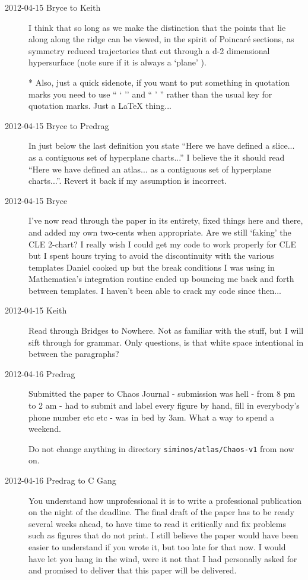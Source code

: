 \begin{description}
\item[2012-04-15 Bryce to Keith] I think that so long as we make the distinction that the points that lie along along the ridge can be viewed, in the spirit of Poincar\'{e} sections, as symmetry reduced trajectories that cut through a d-2 dimensional hypersurface (note sure if it is always a `plane' ).

* Also, just a quick sidenote, if you want to put something in quotation marks you need to use `` ` '' and `` ' '' rather than the usual key for quotation marks. Just a LaTeX thing...

\item[2012-04-15 Bryce to Predrag] In  just below the last definition you state ``Here we have defined a slice... as a contiguous set of hyperplane charts...'' I believe the it should read ``Here we have defined an atlas... as a contiguous set of hyperplane charts...''. Revert it back if my assumption is incorrect.

\item[2012-04-15 Bryce] I've now read through the paper in its entirety, fixed things here and there, and added my own two-cents when appropriate. Are we still `faking' the CLE 2-chart? I really wish I could get my code to work properly for CLE but I spent hours trying to avoid the discontinuity with the various templates Daniel cooked up but the break conditions I was using in Mathematica's integration routine ended up bouncing me back and forth between templates. I haven't been able to crack my code since then...

\item[2012-04-15 Keith] Read through Bridges to Nowhere.  Not as familiar with the stuff, but I will sift through for grammar.  Only questions, is that white space intentional in between the paragraphs?

\item[2012-04-16 Predrag] Submitted the paper to Chaos Journal -
submission was hell - from 8 pm to 2 am - had to submit and label every
figure by hand, fill in everybody's phone number etc etc - was in bed by
3am. What a way to spend a weekend.

Do not change anything in directory \texttt{siminos/atlas/Chaos-v1} from
now on.

\item[2012-04-16 Predrag to C Gang]
You understand how unprofessional it is to write a professional
publication on the night of the deadline. The final draft of the paper
has to be ready several weeks ahead, to have time to read it critically
and fix problems such as figures that do not print. I still believe the
paper would have been easier to understand if you wrote it, but too late
for that now. I would have let you hang in the wind, were it not that I
had personally asked for and promised to deliver that this paper will be
delivered.


\end{description}
